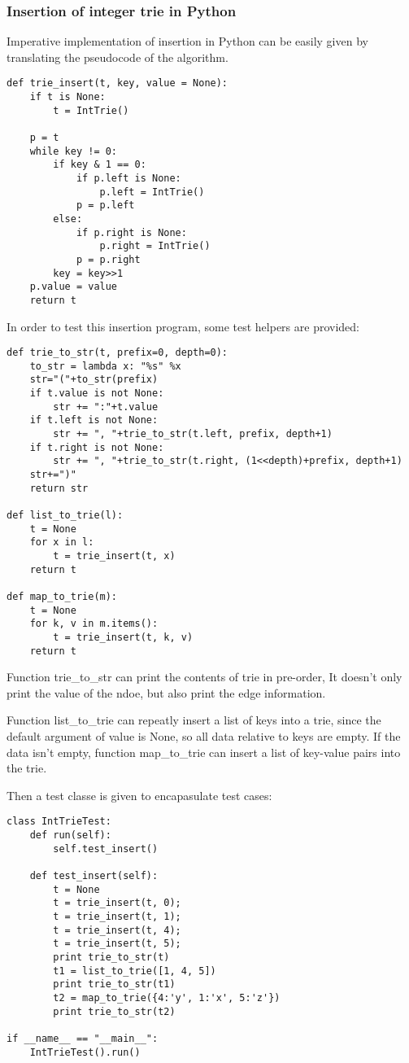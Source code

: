 \documentclass{article}
\begin{document}
\subsubsection*{Insertion of integer trie in Python}
Imperative implementation of insertion in Python can be easily given by translating
the pseudocode of the algorithm.

\lstset{language=Python}
\begin{lstlisting}
def trie_insert(t, key, value = None):
    if t is None:
        t = IntTrie()

    p = t
    while key != 0:
        if key & 1 == 0:
            if p.left is None:
                p.left = IntTrie()
            p = p.left
        else:
            if p.right is None:
                p.right = IntTrie()
            p = p.right
        key = key>>1
    p.value = value
    return t
\end{lstlisting}

In order to test this insertion program, some test helpers are provided:

\begin{lstlisting}
def trie_to_str(t, prefix=0, depth=0):
    to_str = lambda x: "%s" %x
    str="("+to_str(prefix)
    if t.value is not None:
        str += ":"+t.value
    if t.left is not None:
        str += ", "+trie_to_str(t.left, prefix, depth+1)
    if t.right is not None:
        str += ", "+trie_to_str(t.right, (1<<depth)+prefix, depth+1)
    str+=")"
    return str

def list_to_trie(l):
    t = None
    for x in l:
        t = trie_insert(t, x)
    return t

def map_to_trie(m):
    t = None
    for k, v in m.items():
        t = trie_insert(t, k, v)
    return t
\end{lstlisting}

Function trie\_to\_str can print the contents of trie in pre-order,
It doesn't only print the value of the ndoe, but also print the edge information.

Function list\_to\_trie can repeatly insert a list of keys into a trie, since the
default argument of value is None, so all data relative to keys are empty. If the
data isn't empty, function map\_to\_trie can insert a list of key-value pairs into 
the trie.

Then a test classe is given to encapasulate test cases:

\begin{lstlisting}
class IntTrieTest:
    def run(self):
        self.test_insert()

    def test_insert(self):
        t = None
        t = trie_insert(t, 0);
        t = trie_insert(t, 1);
        t = trie_insert(t, 4);
        t = trie_insert(t, 5);
        print trie_to_str(t)
        t1 = list_to_trie([1, 4, 5])
        print trie_to_str(t1)
        t2 = map_to_trie({4:'y', 1:'x', 5:'z'})
        print trie_to_str(t2)

if __name__ == "__main__":
    IntTrieTest().run()
\end{lstlisting}
\end{document}
